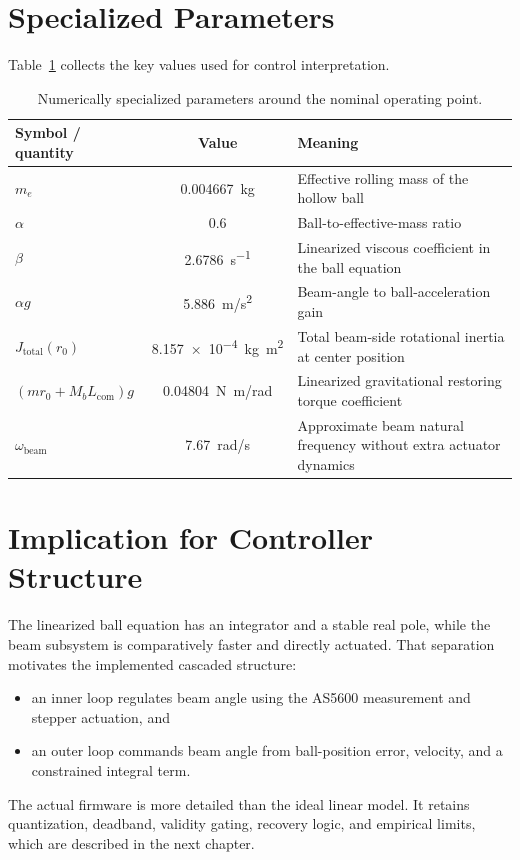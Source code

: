 \section{Specialized Parameters}

Table~\ref{tab:specialized_parameters} collects the key values used for control
interpretation.

\begin{table}[tbp]
  \centering
  \small
  \caption{Numerically specialized parameters around the nominal operating point.}
  \label{tab:specialized_parameters}
  \begin{tabularx}{\linewidth}{@{}l c X@{}}
    \toprule
    Symbol / quantity & Value & Meaning \\
    \midrule
    $m_e$ & \SI{0.004667}{kg} & Effective rolling mass of the hollow ball \\
    $\alpha$ & 0.6 & Ball-to-effective-mass ratio \\
    $\beta$ & \SI{2.6786}{s^{-1}} & Linearized viscous coefficient in the ball equation \\
    $\alpha g$ & \SI{5.886}{m/s^2} & Beam-angle to ball-acceleration gain \\
    $J_{\text{total}}(r_0)$ & \SI{8.157e-4}{kg.m^2} & Total beam-side rotational inertia at center position \\
    $(mr_0 + M_bL_{\text{com}})g$ & \SI{0.04804}{N.m/rad} & Linearized gravitational restoring torque coefficient \\
    $\omega_{\text{beam}}$ & \SI{7.67}{rad/s} & Approximate beam natural frequency without extra actuator dynamics \\
    \bottomrule
  \end{tabularx}
\end{table}

\section{Implication for Controller Structure}

The linearized ball equation has an integrator and a stable real pole, while the beam
subsystem is comparatively faster and directly actuated. That separation motivates the
implemented cascaded structure:

\begin{itemize}
  \item an inner loop regulates beam angle using the AS5600 measurement and stepper
  actuation, and
  \item an outer loop commands beam angle from ball-position error, velocity, and a
  constrained integral term.
\end{itemize}

The actual firmware is more detailed than the ideal linear model. It retains
quantization, deadband, validity gating, recovery logic, and empirical limits, which
are described in the next chapter.
